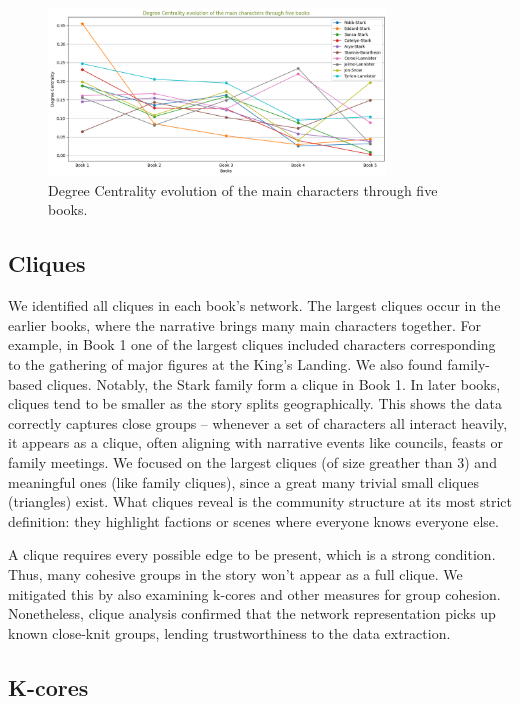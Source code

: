 \documentclass[12pt, a4paper]{article}
\begin{document}
\begin{figure}[htbp]
\centering
\includegraphics[width=0.8\textwidth]{deg-cent-evolution.png}
\caption{Degree Centrality evolution of the main characters through five books.}
\label{fig:deg_cent_evolution}
\end{figure}

\subsection*{Cliques}
We identified all cliques in each book's network. The largest cliques occur in the earlier books, where the narrative brings many main characters together. For example, in Book 1 one of the largest cliques included characters corresponding to the gathering of major figures at the King's Landing. We also found family-based cliques. Notably, the Stark family form a clique in Book 1. In later books, cliques tend to be smaller as the story splits geographically. This shows the data correctly captures close groups – whenever a set of characters all interact heavily, it appears as a clique, often aligning with narrative events like councils, feasts or family meetings. 
We focused on the largest cliques (of size greather than 3) and meaningful ones (like family cliques), since a great many trivial small cliques (triangles) exist. What cliques reveal is the community structure at its most strict definition: they highlight factions or scenes where everyone knows everyone else. 

A clique requires every possible edge to be present, which is a strong condition. Thus, many cohesive groups in the story won't appear as a full clique. We mitigated this by also examining k-cores and other measures for group cohesion. Nonetheless, clique analysis confirmed that the network representation picks up known close-knit groups, lending trustworthiness to the data extraction.

\subsection*{K-cores}
\end{document}
